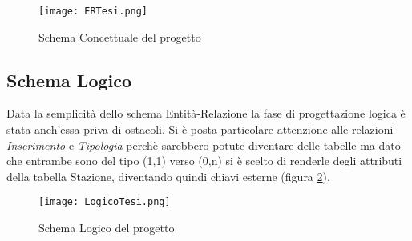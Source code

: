 \begin{figure}[ht!]
    \centering
    {\texttt{[image: ERTesi.png]}}
    \caption{Schema Concettuale del progetto}
    \label{schemaEr}
\end{figure} 

\subsection{Schema Logico}
Data la semplicità dello schema Entità-Relazione la fase di progettazione logica
è stata anch'essa priva di ostacoli. Si è posta particolare attenzione alle
relazioni \textit{Inserimento} e \textit{Tipologia} perchè sarebbero potute diventare delle
tabelle ma dato che entrambe sono del tipo (1,1) verso (0,n) si è scelto di
renderle degli attributi della tabella Stazione, diventando quindi chiavi
esterne (figura \ref{schemaLogico}). 

\begin{figure}[ht!]
    \centering
    {\texttt{[image: LogicoTesi.png]}}
    \caption{Schema Logico del progetto}
    \label{schemaLogico}
\end{figure} 

